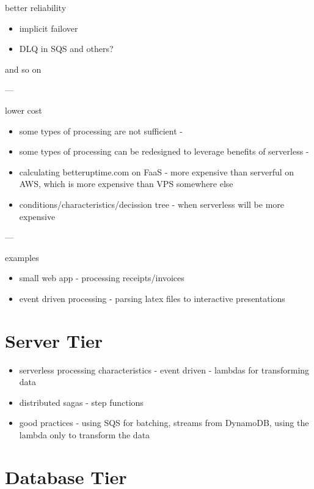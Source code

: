 better reliability

\begin{itemize}
    \item implicit failover
    \item DLQ in SQS and others?
\end{itemize}

and so on

---

lower cost

\begin{itemize}
    \item some types of processing are not sufficient - \cite{BerkeleyServerless}
    \item some types of processing can be redesigned to leverage benefits of serverless - \cite{BerkeleyServerless}
    \item calculating betteruptime.com on FaaS - more expensive than serverful on AWS, which is more expensive than VPS somewhere else
    \item conditions/characteristics/decission tree - when serverless will be more expensive
\end{itemize}

---

examples

\begin{itemize}
    \item small web app - processing receipts/invoices
    \item event driven processing - parsing latex files to interactive presentations
\end{itemize}

\section{Server Tier}

\begin{itemize}
    \item serverless processing characteristics - event driven - lambdas for transforming data
    \item distributed sagas - step functions
    \item good practices - using SQS for batching, streams from DynamoDB, using the lambda only to transform the data
\end{itemize}

\section{Database Tier}

